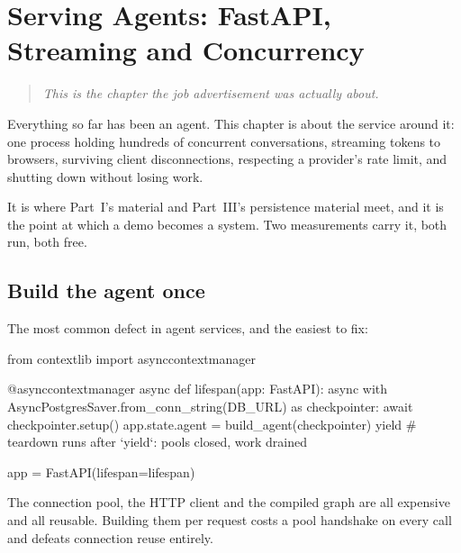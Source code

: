 \chapter{Serving Agents: FastAPI, Streaming and Concurrency}
\label{ch:serving}

\begin{quote}\itshape
This is the chapter the job advertisement was actually about.
\end{quote}

\noindent
Everything so far has been an agent. This chapter is about the service around it:
one process holding hundreds of concurrent conversations, streaming tokens to
browsers, surviving client disconnections, respecting a provider's rate limit,
and shutting down without losing work.

It is where Part~I's  material and Part~III's persistence material
meet, and it is the point at which a demo becomes a system. Two measurements
carry it, both run, both free.


\section{Build the agent once}
\label{sec:lifespan}

The most common defect in agent services, and the easiest to fix:

\begin{python}[caption={\code{lifespan}, not the request handler}, label={lst:lifespan}]
from contextlib import asynccontextmanager


@asynccontextmanager
async def lifespan(app: FastAPI):
    async with AsyncPostgresSaver.from_conn_string(DB_URL) as checkpointer:
        await checkpointer.setup()
        app.state.agent = build_agent(checkpointer)
        yield
    # teardown runs after `yield`: pools closed, work drained


app = FastAPI(lifespan=lifespan)
\end{python}

The connection pool, the HTTP client and the compiled graph are all expensive and
all reusable. Building them per request costs a pool handshake on every call and
defeats connection reuse entirely.

